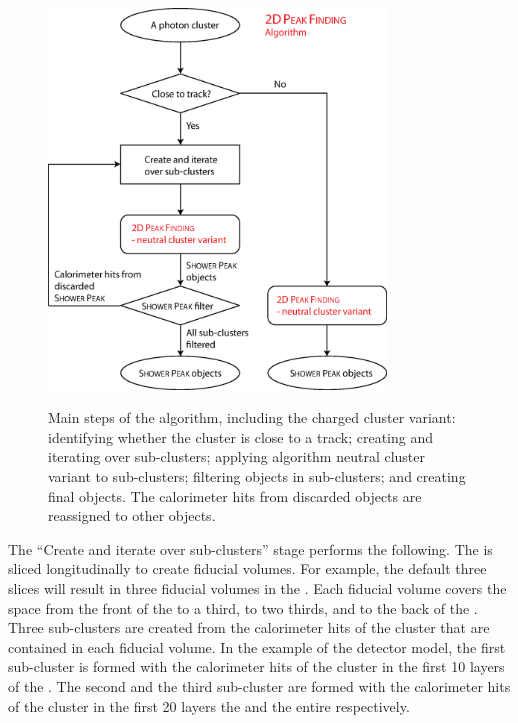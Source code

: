 \begin{figure}[tbph]
\centering
{\includegraphics[width=0.8\textwidth]{photon/2DpeakFindingTrack2}}
\caption[Flow chart for \peakFinding algorithm.]
{Main steps of the  \peakFinding algorithm, including the charged cluster variant: identifying whether the cluster is close to a track; creating and iterating over sub-clusters; applying \peakFinding algorithm neutral cluster variant to sub-clusters; filtering \ShowerPeak objects in sub-clusters; and creating final \ShowerPeak objects. The calorimeter hits from discarded  \ShowerPeak objects are reassigned to other  \ShowerPeak objects.}
\label{fig:photonPeakFindingFlow}
\end{figure}


The ``Create and iterate over sub-clusters'' stage performs the following. The \ECAL is sliced longitudinally to create fiducial volumes. For example, the default three slices will result in three  fiducial volumes in the \ECAL. Each fiducial volume covers the  space from the front of the \ECAL to a third, to two thirds, and to the back of the \ECAL. Three sub-clusters are created from the calorimeter hits of the cluster that are contained in each fiducial volume. In the example of the \ILD detector model, the first sub-cluster is formed with the  calorimeter hits of the cluster in the first 10 layers of the \ECAL. The second and the third sub-cluster are formed with the  calorimeter hits of the cluster in the first 20 layers  the \ECAL and the entire \ECAL respectively.

